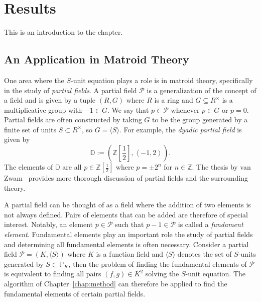 
\chapter{Results}%
\label{chap:results}

This is an introduction to the chapter.

\section{An Application in Matroid Theory}%
\label{sec:an-application-in-matroid-theory}

One area where the \(S\)-unit equation plays a role is in matroid theory, specifically in the study of \textit{partial fields}. A partial field \(\mathcal{P}\) is a generalization of the concept of a field and is given by a tuple \((R, G)\) where \(R\) is a ring and \(G \subseteq R^{\times}\) is a multiplicative group with \(-1 \in G\). We say that \(p \in \mathcal{P}\) whenever \(p \in G\) or \(p = 0\). Partial fields are often constructed by taking \(G\) to be the group generated by a finite set of units \(S \subset R^{\times}\), so \(G = \langle S \rangle\). For example, the \textit{dyadic partial field} is given by
\[\mathbb{D} := \left( \mathbb{Z} \left[ \frac{1}{2} \right], \left\langle -1, 2 \right\rangle \right).\]
The elements of \(\mathbb{D}\) are all \(p \in \mathbb{Z} \left[ \frac{1}{2} \right]\) where \(p = \pm 2^{n}\) for \(n \in \mathbb{Z}\). The thesis by van Zwam~\cite{zwam-2009-partial-fields-in} provides more thorough discussion of partial fields and the surrounding theory.

A partial field can be thought of as a field where the addition of two elements is not always defined. Pairs of elements that can be added are therefore of special interest. Notably, an element \(p \in \mathcal{P}\) such that \(p - 1 \in \mathcal{P}\) is called a \textit{fundament element}. Fundamental elements play an important role the study of partial fields and determining all fundamental elements is often necessary. Consider a partial field \(\mathcal{P} = (K, \langle S \rangle)\) where \(K\) is a function field and \(\langle S \rangle\) denotes the set of \(S\)-units generated by \(S \subset \mathbb{P}_{K}\), then the problem of finding the fundamental elements of \(\mathcal{P}\) is equivalent to finding all pairs \((f, g) \in K^{2}\) solving the \(S\)-unit equation. The algorithm of Chapter~\ref{chap:method} can therefore be applied to find the fundamental elements of certain partial fields.
